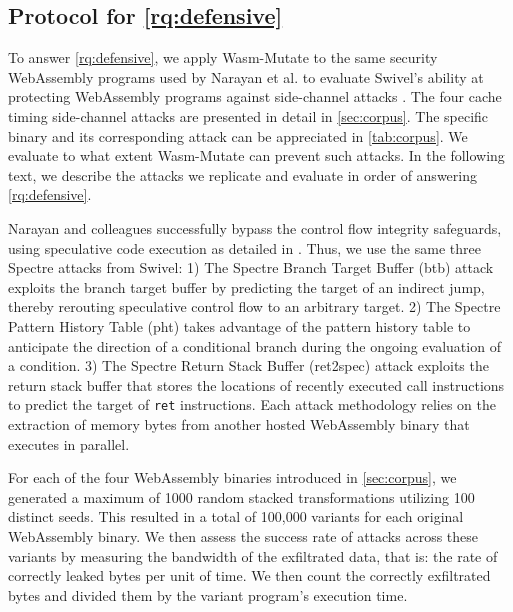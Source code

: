 \documentclass[a4paper,fleqn]{cas-dc}
\newcommand*\badge[1]{ \colorbox{red}{\color{white}#1}}
\newcommand{\tool}{{\sc Wasm-Mutate}\xspace}
\newcommand{\Wasm}{WebAssembly\xspace}
\newcommand{\wasm}{\Wasm}
\newcommand{\todo}[1]{%
\refstepcounter{todo}
\noindent\textbf{\badge{TODO}} {\color{red}#1}
\addcontentsline{td}{todo}
{\color{red}\thesection.\thetodo\xspace #1}}
\begin{document}
\subsection{Protocol for \ref{rq:defensive}}
\label{protocol:rq3}

\newcommand{\poct}{\emph{Cache timing POC}\xspace}
\newcommand{\pocd}{\emph{Differential computing POC}\xspace}
\newcommand{\pocp}{\emph{Port contention POC}\xspace}

To answer \ref{rq:defensive}, we apply \tool to the same security \wasm programs used by Narayan et al. to evaluate Swivel's ability at protecting \wasm programs against side-channel attacks \cite{Swivel}. 
The four cache timing side-channel attacks are presented in detail in \autoref{sec:corpus}. 
The specific binary and its corresponding attack can be appreciated in \autoref{tab:corpus}.
We evaluate to what extent \tool can prevent such attacks.
In the following text, we describe the attacks we replicate and evaluate in order of answering \ref{rq:defensive}.


Narayan and colleagues successfully bypass the control flow integrity safeguards, using speculative code execution as detailed in \cite{Spectre}. 
Thus, we use the same three Spectre attacks from Swivel:
1) The Spectre Branch Target Buffer (btb) attack exploits the branch target buffer by predicting the target of an indirect jump, thereby rerouting speculative control flow to an arbitrary target.
2) The Spectre Pattern History Table (pht) takes advantage of the pattern history table to anticipate the direction of a conditional branch during the ongoing evaluation of a condition. 
3) The Spectre Return Stack Buffer (ret2spec) attack exploits the return stack buffer that stores the locations of recently executed call instructions to predict the target of \texttt{ret} instructions. 
Each attack methodology relies on the extraction of memory bytes from another hosted \wasm binary that executes in parallel.


For each of the four \wasm binaries introduced in \autoref{sec:corpus}, we generated a maximum of 1000 random stacked transformations utilizing 100 distinct seeds. 
This resulted in a total of 100,000 variants for each original \wasm binary.
We then assess the success rate of attacks across these variants by measuring the bandwidth of the exfiltrated data, that is: the rate of correctly leaked bytes per unit of time. 
We then count the correctly exfiltrated bytes and divided them by the variant program's execution time. 
\end{document}
